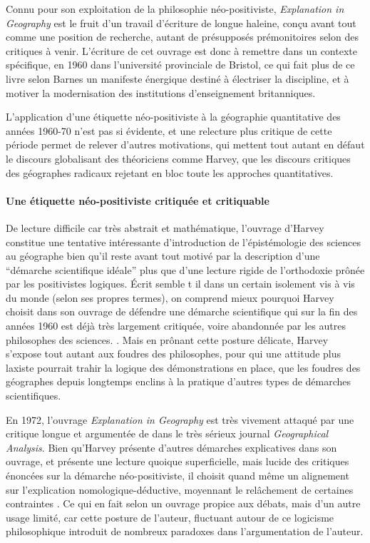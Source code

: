 Connu pour son exploitation de la philosophie néo-positiviste, \textit{Explanation in Geography} est le fruit d'un travail d'écriture de longue haleine, conçu avant tout comme une position de recherche, autant de présupposés prémonitoires selon \textcite[47]{Barnes2006b} des critiques à venir. L'écriture de cet ouvrage est donc à remettre dans un contexte spécifique, en 1960 dans l'université provinciale de Bristol, ce qui fait plus de ce livre selon Barnes \autocite[31-36]{Barnes2006b} un manifeste énergique destiné à électriser la discipline, et à motiver la modernisation des institutions d'enseignement britanniques.

L'application d'une étiquette néo-positiviste à la géographie quantitative des années 1960-70 n'est pas si évidente, et une relecture plus critique de cette période permet de relever d'autres motivations, qui mettent tout autant en défaut le discours globalisant des théoriciens comme Harvey, que les discours critiques des géographes radicaux rejetant en bloc toute les approches quantitatives.

\paragraph{Une étiquette néo-positiviste critiquée et critiquable}

De lecture difficile car très abstrait et mathématique, l'ouvrage d'Harvey constitue une tentative intéressante d'introduction de l'épistémologie des sciences au géographe bien qu'il reste avant tout motivé par la description d'une \enquote{démarche scientifique idéale} plus que d'une lecture rigide de l'orthodoxie prônée par les positivistes logiques. Écrit semble t il dans un certain isolement vis à vis du monde (selon ses propres termes), on comprend mieux pourquoi Harvey choisit dans son ouvrage de défendre une démarche scientifique qui sur la fin des années 1960 est déjà très largement critiquée, voire abandonnée par les autres philosophes des sciences. \autocite[147]{Ouelbani2006}. Mais en prônant cette posture délicate, Harvey s'expose tout autant aux foudres des philosophes, pour qui une attitude plus laxiste pourrait trahir la logique des démonstrations en place, que les foudres des géographes depuis longtemps enclins à la pratique d'autres types de démarches scientifiques.


En 1972, l'ouvrage \textit{Explanation in Geography} est très vivement attaqué par une critique longue et argumentée de \textcite{Gale1972} dans le très sérieux journal \textit{Geographical Analysis}. Bien qu'Harvey présente d'autres démarches explicatives dans son ouvrage, et présente une lecture quoique superficielle, mais lucide des critiques énoncées sur la démarche néo-positiviste, il choisit quand même un alignement sur l'explication nomologique-déductive, moyennant le relâchement de certaines contraintes \autocite[39-40]{Paterson1984}. Ce qui en fait selon \textcite{Gale1972} un ouvrage propice aux débats, mais d'un autre usage limité, car cette posture de l'auteur, fluctuant autour de ce logicisme philosophique introduit de nombreux paradoxes dans l'argumentation de l'auteur.

